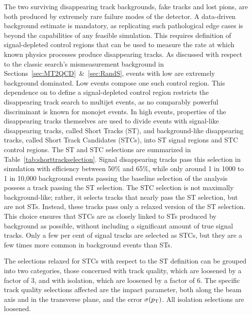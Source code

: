   The two surviving disappearing track backgrounds, fake tracks and lost pions, are both produced by extremely rare failure modes of the detector.
  A data-driven background estimate is mandatory, as replicating such pathological edge cases is beyond the capabilities of any feasible simulation.
  This requires definition of signal-depleted control regions that can be used to measure the rate at which known physics processes produce disappearing tracks.
  As discussed with respect to the classic search's mismeasurement background in Sections~\ref{sec:MT2QCD}~\&~\ref{sec:RandS}, events with low \mttwo are extremely background dominated.
  Low \mttwo events compose one such control region.
  This dependence on \mttwo to define a signal-depleted control region restricts the disappearing track search to multijet events, as no comparably powerful discriminant is known for monojet events.
  In high \mttwo events, properties of the disappearing tracks themselves are used to divide events with signal-like disappearing tracks, called Short Tracks (ST), and background-like disappearing tracks, called Short Track Candidates (STCs), into ST signal regions and STC control regions.
  The ST and STC selections are summarized in Table~\ref{tab:shorttrackselection}.
  Signal disappearing tracks pass this selection in simulation with efficiency between 50\% and 65\%, while only around 1 in 1000 to 1 in 10,000 background events passing the baseline selection of the \mttwo analysis possess a track passing the ST selection.
  The STC selection is not maximally background-like; rather, it selects tracks that nearly pass the ST selection, but are not STs.
  Instead, these tracks pass only a relaxed version of the ST selection.
  This choice ensures that STCs are as closely linked to STs produced by background as possible, without including a significant amount of true signal tracks.
  Only a few per cent of signal tracks are selected as STCs, but they are a few times more common in background events than STs.

  The selections relaxed for STCs with respect to the ST definition can be grouped into two categories, those concerned with track quality, which are loosened by a factor of 3, and with isolation, which are loosened by a factor of 6.
  The specific track quality selections affected are the impact parameter, both along the beam axis and in the transverse plane, and the \pt error $\sigma(p_{\mathrm{T}})$.
  All isolation selections are loosened.  

